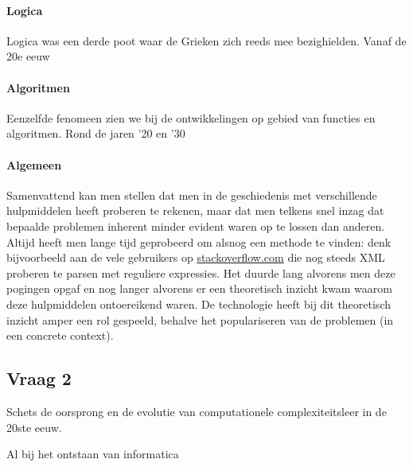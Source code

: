 \documentclass[../main.tex]{subfiles}
\begin{document}
\begin{solution}
\paragraph{Logica}
Logica was een derde poot waar de Grieken zich reeds mee bezighielden. Vanaf de
20e eeuw 

\paragraph{Algoritmen}
Eenzelfde fenomeen zien we bij de ontwikkelingen op gebied van functies en algoritmen.
Rond de jaren '20 en '30

\paragraph{Algemeen}
Samenvattend kan men stellen dat men in de geschiedenis met verschillende hulpmiddelen
heeft proberen te rekenen, maar dat men telkens snel inzag dat bepaalde problemen
inherent minder evident waren op te lossen dan anderen. Altijd heeft men lange
tijd geprobeerd om alsnog een methode te vinden: denk bijvoorbeeld aan de vele
gebruikers op \url{stackoverflow.com} die nog steeds XML proberen te parsen met
reguliere expressies. Het duurde lang alvorens men deze pogingen opgaf en nog
langer alvorens er een theoretisch inzicht kwam waarom deze hulpmiddelen ontoereikend
waren. De technologie heeft bij dit theoretisch inzicht amper een rol gespeeld,
behalve het populariseren van de problemen (in een concrete context).
\end{solution}


\subsection{Vraag 2}
\begin{question}
Schets de oorsprong en de evolutie van computationele complexiteitsleer in de 20ste
eeuw.
\end{question}
\begin{solution}
Al bij het ontstaan van informatica
\end{solution}
\end{document}

